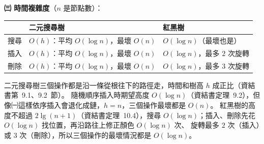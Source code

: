\begin{pastsoln}
\textbf{㈢ 時間複雜度}（$n$ 是節點數）：
\begin{center}
\small
\begin{tabular}{lll}
\toprule
 & 二元搜尋樹 & 紅黑樹 \\
\midrule
搜尋 & $O(h)$：平均 $O(\log n)$，最壞 $O(n)$ & $O(\log n)$（最壞也是） \\
插入 & $O(h)$：平均 $O(\log n)$，最壞 $O(n)$ & $O(\log n)$，最多 $2$ 次旋轉 \\
刪除 & $O(h)$：平均 $O(\log n)$，最壞 $O(n)$ & $O(\log n)$，最多 $3$ 次旋轉 \\
\bottomrule
\end{tabular}
\end{center}
二元搜尋樹三個操作都是沿一條從根往下的路徑走，時間和樹高 $h$ 成正比（資結書第~9.1、9.2~節）。 隨機順序插入時期望高度
$O(\log n)$（資結書定理~9.2），但像㈠這樣依序插入會退化成鏈，$h = n$，三個操作最壞都是 $O(n)$。 紅黑樹的高度不超過
$2\lg(n + 1)$（資結書定理~10.4），搜尋 $O(\log n)$；插入、刪除先花 $O(\log n)$ 找位置，再沿路往上修正顏色 $O(\log n)$ 次、
旋轉最多 $2$ 次（插入）或 $3$ 次（刪除），所以三個操作的最壞情況都是 $O(\log n)$。
\end{pastsoln}
